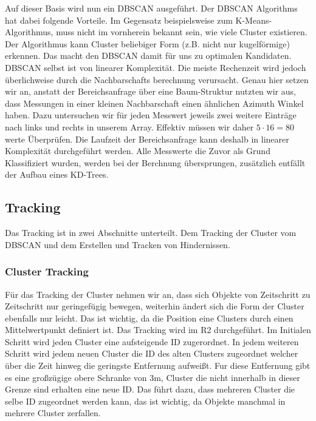 \documentclass[11pt,oneside,openright]{mpreport}
\begin{document}
Auf dieser Basis wird nun ein \ac{DBSCAN} \cite{DBSCAN} ausgeführt. Der \ac{DBSCAN} Algorithms hat dabei folgende Vorteile.
Im Gegensatz beispielsweise zum K-Means-Algorithmus, muss nicht im vornherein bekannt sein, wie viele Cluster existieren. Der Algorithmus kann Cluster beliebiger Form 
(z.B. nicht nur kugelförmige) erkennen. Das macht den \ac{DBSCAN} damit für uns zu optimalen Kandidaten. \ac{DBSCAN} selbst ist von linearer Komplexität.
Die meiste Rechenzeit wird jedoch überlichweise durch die Nachbarschafts berechnung verursacht. Genau hier setzen wir an, anstatt der Bereichsanfrage über eine Baum-Struktur
nutzten wir aus, dass Messungen in einer kleinen Nachbarschaft einen ähnlichen Azimuth Winkel haben. Dazu untersuchen wir für jeden Messwert jeweils zwei weitere Einträge nach links
und rechts in unserem Array. Effektiv müssen wir daher $5 \cdot 16 = 80$ werte Überprüfen. Die Laufzeit der Bereichsanfrage kann deshalb in linearer Komplexität durchgeführt
werden. Alle Messwerte die Zuvor als Grund Klassifiziert wurden, werden bei der Berchnung übersprungen, zusätzlich entfällt der Aufbau eines KD-Trees. 


\subsection{Tracking}

Das Tracking ist in zwei Abschnitte unterteilt. Dem Tracking der Cluster vom \ac{DBSCAN} und dem Erstellen und Tracken von Hindernissen.

\subsubsection{Cluster Tracking}
Für das Tracking der Cluster nehmen wir an, dass sich Objekte von Zeitschritt zu Zeitschritt nur geringefügig bewegen, weiterhin
ändert sich die Form der Cluster ebenfalls nur leicht. Das ist wichtig, da die Position eine Clusters durch einen Mittelwertpunkt definiert ist.
Das Tracking wird im R2 durchgeführt. Im Initialen Schritt wird jeden Cluster eine aufsteigende ID zugerordnet.
In jedem weiteren Schritt wird jedem neuen Cluster die ID des alten Clusters zugeordnet welcher über die Zeit hinweg die geringste Entfernung aufweißt.
Fur diese Entfernung gibt es eine großzügige obere Schranke von 3m, Cluster die nicht innerhalb in dieser Grenze sind erhalten eine neue ID.
Das führt dazu, dass mehreren Cluster die selbe ID zugeordnet werden kann, das ist wichtig, da Objekte manchmal in mehrere Cluster zerfallen.
\end{document}

